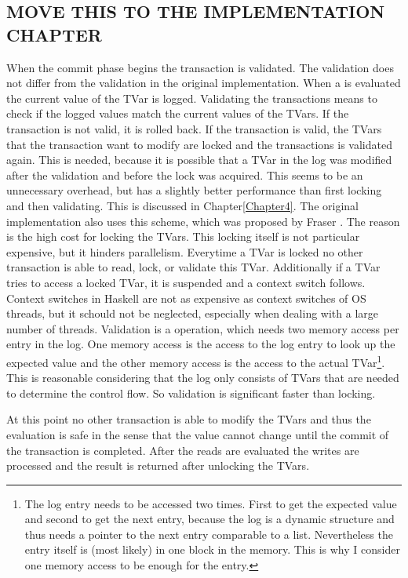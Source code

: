 \subsection{MOVE THIS TO THE IMPLEMENTATION CHAPTER}
When the commit phase begins the transaction is validated. The validation does not differ from the validation 
in the original implementation. When a  is evaluated the current value of the TVar is logged. 
Validating the transactions means to check if the logged values match the current values of the TVars. 
If the transaction is not valid, it is rolled back.
If the transaction is valid, the TVars that the transaction want to modify are locked and the transactions is validated again. 
This is needed, because it is possible that a TVar in the log was modified after the validation and before 
the lock was acquired. This seems to be an unnecessary overhead, but has a slightly better performance than first 
locking and then validating. This is discussed in Chapter\ref{Chapter4}. The original implementation 
also uses this scheme, which was proposed by Fraser \parencite[Page 42]{lockfreedom}. The reason is
the high cost for locking the TVars. This locking itself is not particular expensive, but it hinders parallelism.
Everytime a TVar is locked no other transaction is able to read, lock, or validate this TVar. Additionally if 
a TVar tries to access a locked TVar, it is suspended and a context switch follows. Context switches in Haskell 
are not as expensive as context switches of OS threads, but it schould not be neglected, especially when dealing
with a large number of threads. Validation is a operation, which needs two memory access per entry in the log.
One memory access is the access to the log entry to look up the expected value and the other memory access is
the access to the actual TVar\footnote{The log entry needs to be accessed two times. First to get the expected
value and second to get the next entry, because the log is a dynamic structure and thus needs a pointer
to the next entry comparable to a list. Nevertheless the entry itself is (most likely) in one block in the memory.
This is why I consider one memory access to be enough for the entry.}. This is reasonable considering that the 
log only consists of TVars that are needed to determine the control flow. So validation is significant faster
than locking. 


At this point no other transaction is able to modify the TVars and thus the evaluation is safe in the sense
that the value cannot change until the commit of the transaction is completed. After the reads are evaluated the 
writes are processed and the result is returned after unlocking the TVars.



